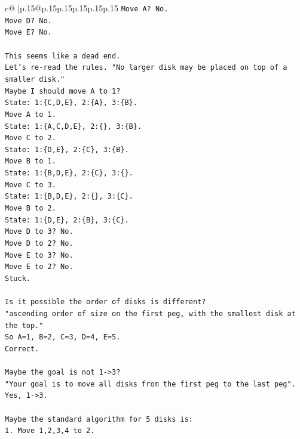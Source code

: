 \documentclass{article}
\begin{document}
{\begin{supertabular}{c@{$\;$}|p{.15\linewidth}@{}p{.15\linewidth}p{.15\linewidth}p{.15\linewidth}p{.15\linewidth}p{.15\linewidth}}
{{{\texttt{Move A? No.} \\
\texttt{Move D? No.} \\
\texttt{Move E? No.} \\
\\ 
\texttt{This seems like a dead end.} \\
\texttt{Let's re{-}read the rules. "No larger disk may be placed on top of a smaller disk."} \\
\texttt{Maybe I should move A to 1?} \\
\texttt{State: 1:\{C,D,E\}, 2:\{A\}, 3:\{B\}.} \\
\texttt{Move A to 1.} \\
\texttt{State: 1:\{A,C,D,E\}, 2:\{\}, 3:\{B\}.} \\
\texttt{Move C to 2.} \\
\texttt{State: 1:\{D,E\}, 2:\{C\}, 3:\{B\}.} \\
\texttt{Move B to 1.} \\
\texttt{State: 1:\{B,D,E\}, 2:\{C\}, 3:\{\}.} \\
\texttt{Move C to 3.} \\
\texttt{State: 1:\{B,D,E\}, 2:\{\}, 3:\{C\}.} \\
\texttt{Move B to 2.} \\
\texttt{State: 1:\{D,E\}, 2:\{B\}, 3:\{C\}.} \\
\texttt{Move D to 3? No.} \\
\texttt{Move D to 2? No.} \\
\texttt{Move E to 3? No.} \\
\texttt{Move E to 2? No.} \\
\texttt{Stuck.} \\
\\ 
\texttt{Is it possible the order of disks is different?} \\
\texttt{"ascending order of size on the first peg, with the smallest disk at the top."} \\
\texttt{So A=1, B=2, C=3, D=4, E=5.} \\
\texttt{Correct.} \\
\\ 
\texttt{Maybe the goal is not 1{-}>3?} \\
\texttt{"Your goal is to move all disks from the first peg to the last peg".} \\
\texttt{Yes, 1{-}>3.} \\
\\ 
\texttt{Maybe the standard algorithm for 5 disks is:} \\
\texttt{1. Move 1,2,3,4 to 2.} \\
}}}
\end{supertabular}}
\end{document}
